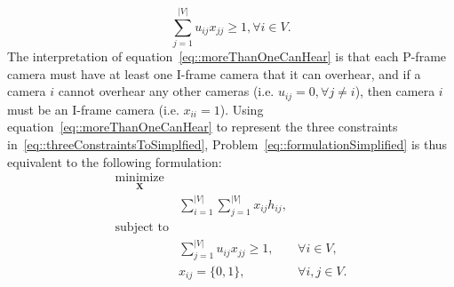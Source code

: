 \begin{equation}
\sum_{j=1}^{|V|} u_{ij} x_{jj} \geq 1, \forall i \in V.
\label{eq::moreThanOneCanHear}
\end{equation}
The interpretation of equation~\eqref{eq::moreThanOneCanHear} is that each P-frame camera must have at least one I-frame camera that it can overhear, and if a camera $i$ cannot overhear any other cameras (i.e. $u_{ij} = 0, \forall j \neq i$), then camera $i$ must be an I-frame camera (i.e. $x_{ii}=1$).
Using equation~\eqref{eq::moreThanOneCanHear} to represent the three constraints in~\eqref{eq::threeConstraintsToSimplfied}, Problem~\eqref{eq::formulationSimplified} is thus equivalent to the following formulation:
\begin{align}
\underset{\mathbf{X}}{\text{minimize}} & & \nonumber \\
	&\sum_{i=1}^{|V|} \sum_{j=1}^{|V|}  x_{ij} h_{ij}, & \nonumber \\
\text{subject to} & & \nonumber \\
	&\sum_{j=1}^{|V|} u_{ij} x_{jj} \geq 1, &\forall i \in V, \nonumber \\
	&x_{ij} = \{0,1\}, &\forall i,j \in V.
\label{eq::formulationSimplifiedAsGraph}
\end{align}

